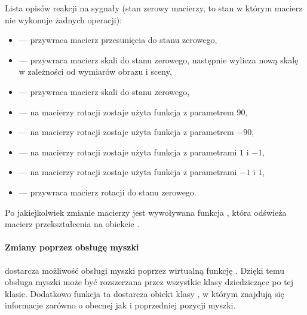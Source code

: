 \par
Lista opisów reakcji na sygnały (stan zerowy macierzy, to stan w którym macierz nie wykonuje żadnych operacji):
\begin{itemize}

    \item {} --- przywraca macierz przesunięcia do stanu zerowego,

    \item {} --- przywraca macierz skali do stanu zerowego, następnie wylicza nową skalę w zależności od wymiarów obrazu i sceny,

    \item {} --- przywraca macierz skali do stanu zerowego,

    \item {} --- na macierzy rotacji zostaje użyta funkcja  z parametrem $90$,

    \item {} --- na macierzy rotacji zostaje użyta funkcja  z parametrem $-90$,

    \item {} --- na macierzy rotacji zostaje użyta funkcja  z parametrami $1$ i $-1$,

    \item {} --- na macierzy rotacji zostaje użyta funkcja  z parametrami $-1$ i $1$,

    \item {} --- przywraca macierz rotacji do stanu zerowego.

\end{itemize}
Po jakiejkolwiek zmianie macierzy jest wywoływana funkcja , która odświeża macierz przekształcenia na obiekcie .

\paragraph{Zmiany poprzez obsługę myszki}

\par
{} dostarcza możliwość obsługi myszki poprzez wirtualną funkcję .
Dzięki temu obsługa myszki może być rozszerzana przez wszystkie klasy dziedziczące po tej klasie.
Dodatkowo funkcja ta dostarcza obiekt klasy , w którym znajdują się informacje zarówno o obecnej jak i poprzedniej pozycji myszki.

